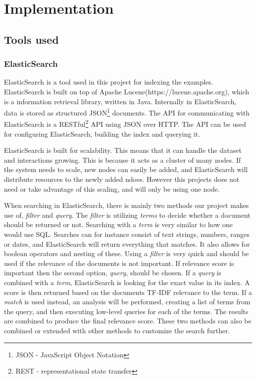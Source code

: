 
\chapter{Implementation}\label{cap_4}

\section{Tools used}

\subsection{ElasticSearch} \label{elasticsearch}
ElasticSearch is a tool used in this project for indexing the examples. ElasticSearch is built on top of Apache Lucene(https://lucene.apache.org), which is a information retrieval library, written in Java. Internally in ElasticSearch, data is stored as structured JSON\footnote{JSON - JavaScript Object Notation} documents. The API for communicating with ElasticSearch is a RESTful\footnote{REST - representational state transfer} API using JSON over HTTP. The API can be used for configuring ElasticSearch, building the index and querying it. 

ElasticSearch is built for scalability. This means that it can handle the dataset and interactions growing. This is because it acts as a cluster of many nodes. If the system needs to scale, new nodes can easily be added, and ElasticSearch will distribute resources to the newly added ndoes. However this projects does not need or take advantage of this scaling, and will only be using one node.

When searching in ElasticSearch, there is mainly two methods our project makes use of, \textit{filter} and \textit{query}. The \textit{filter} is utilizing \textit{terms} to decide whether a document should be returned or not. Searching with a \textit{term} is very similar to how one would use SQL. %
Searches can for instance consist of text strings, numbers, ranges or dates, and ElasticSearch will return everything that matches. It also allows for boolean operators and nesting of these. Using a \textit{filter} is very quick and should be used if the relevance of the documents is not important. If relevance score is important then the second option, \textit{query}, should be chosen. If a \textit{query} is combined with a \textit{term}, ElasticSearch is looking for the exact value in its index. A score is then returned based on the documents TF-IDF relevance to the term. 
If a \textit{match} is used instead, an analysis will be performed, creating a list of terms from the query, and then executing low-level queries for each of the terms. The results are combined to produce the final relevance score. These two methods can also be combined or extended with other methods to customize the search further.



